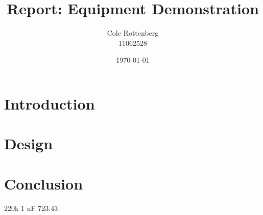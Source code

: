 \documentclass{article}
\title{Report: Equipment Demonstration}
\author{Cole Rottenberg \\ 11062528}
\date{\today}
\begin{document}
\maketitle

\section*{Introduction}

\section*{Design}


\section*{Conclusion}
220k 
1 nF
723.43
\end{document}
